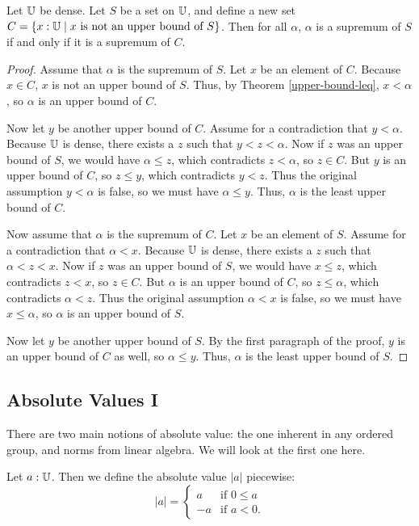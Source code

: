 \documentclass[../math.tex]{subfiles}
\begin{document}
\begin{theorem}
    Let $\mathbb{U}$ be dense.  Let $S$ be a set on $\mathbb{U}$, and define a new set $C = \{x
    : \mathbb{U} \mid \text{$x$ is not an upper bound of $S$}\}$.  Then for all
    $\alpha$, $\alpha$ is a supremum of $S$ if and only if it is a supremum of
    $C$.
\end{theorem}
\begin{proof}
    Assume that $\alpha$ is the supremum of $S$.  Let $x$ be an element of $C$.
    Because $x \in C$, $x$ is not an upper bound of $S$.  Thus, by Theorem
    \ref{upper-bound-leq}, $x < \alpha$, so $\alpha$ is an upper bound of $C$.

    Now let $y$ be another upper bound of $C$.  Assume for a contradiction that
    $y < \alpha$.  Because $\mathbb{U}$ is dense, there exists a $z$ such that $y < z <
    \alpha$.  Now if $z$ was an upper bound of $S$, we would have $\alpha \leq
    z$, which contradicts $z < \alpha$, so $z \in C$.  But $y$ is an upper bound
    of $C$, so $z \leq y$, which contradicts $y < z$.  Thus the original
    assumption $y < \alpha$ is false, so we must have $\alpha \leq y$.  Thus,
    $\alpha$ is the least upper bound of $C$.

    Now assume that $\alpha$ is the supremum of $C$.  Let $x$ be an element of
    $S$.  Assume for a contradiction that $\alpha < x$.  Because $\mathbb{U}$ is dense,
    there exists a $z$ such that $\alpha < z < x$.  Now if $z$ was an upper
    bound of $S$, we would have $x \leq z$, which contradicts $z < x$, so $z \in
    C$.  But $\alpha$ is an upper bound of $C$, so $z \leq \alpha$, which
    contradicts $\alpha < z$.  Thus the original assumption $\alpha < x$ is
    false, so we must have $x \leq \alpha$, so $\alpha$ is an upper bound of
    $S$.

    Now let $y$ be another upper bound of $S$.  By the first paragraph of the
    proof, $y$ is an upper bound of $C$ as well, so $\alpha \leq y$.  Thus,
    $\alpha$ is the least upper bound of $S$.
\end{proof}

\subsection{Absolute Values I}

There are two main notions of absolute value: the one inherent in any ordered
group, and norms from linear algebra.  We will look at the first one here.

\begin{definition}
    Let $a : \mathbb{U}$.  Then we define the absolute value $|a|$ piecewise:
    \[
        |a| = \begin{cases}
            a & \text{if $0 \leq a$} \\
            -a & \text{if $a < 0$.}
        \end{cases}
    \]
\end{definition}
\end{document}

